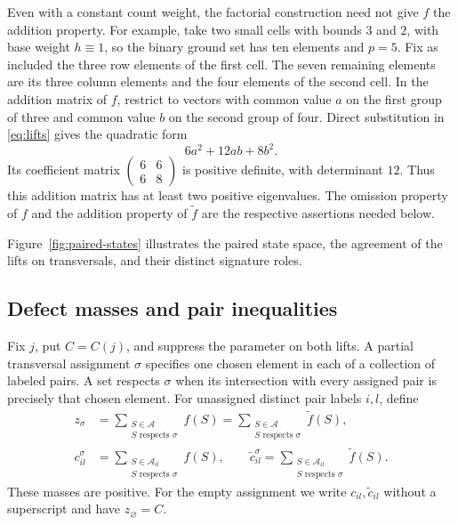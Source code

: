 \begin{remark}
\label{rem:distinct-lifts}
Even with a constant count weight, the factorial construction need
not give \(f\) the addition property.
For example, take two small cells with bounds \(3\) and \(2\),
with base weight \(h\equiv1\), so the binary ground set has ten
elements and \(p=5\).
Fix as included the three row elements of the first cell.
The seven remaining elements are its three column elements and
the four elements of the second cell.
In the addition matrix of \(f\), restrict to vectors with common
value \(a\) on the first group of three and common value \(b\) on
the second group of four.
Direct substitution in \eqref{eq:lifts} gives the quadratic form
\[
 6a^2+12ab+8b^2.
\]
Its coefficient matrix
\(\left(\begin{smallmatrix}6&6\\6&8\end{smallmatrix}\right)\)
is positive definite, with determinant \(12\).
Thus this addition matrix has at least two positive eigenvalues.
The omission property of \(f\) and the addition property of
\(\widetilde f\) are the respective assertions needed below.
\end{remark}

Figure~\ref{fig:paired-states} illustrates the paired state space,
the agreement of the lifts on transversals, and their distinct
signature roles.


\subsection{Defect masses and pair inequalities}

Fix \(j\), put \(C=C(j)\), and suppress the parameter on both lifts.
A partial transversal assignment \(\sigma\) specifies one chosen
element in each of a collection of labeled pairs.
A set respects \(\sigma\) when its intersection with every assigned
pair is precisely that chosen element.
For unassigned distinct pair labels \(i,l\), define
\begin{align*}
 z_\sigma
 &=\sum_{\substack{S\in\mathcal A\\S\text{ respects }\sigma}}f(S)
   =\sum_{\substack{S\in\mathcal A\\S\text{ respects }\sigma}}
       \widetilde f(S),\\
 c_{il}^{\sigma}
 &=\sum_{\substack{S\in\mathcal A_{il}\\
                   S\text{ respects }\sigma}}f(S),
 \qquad
 \widetilde c_{il}^{\sigma}
 =\sum_{\substack{S\in\mathcal A_{il}\\
                  S\text{ respects }\sigma}}\widetilde f(S).
\end{align*}
These masses are positive.
For the empty assignment we write \(c_{il},\widetilde c_{il}\)
without a superscript and have \(z_\varnothing=C\).

